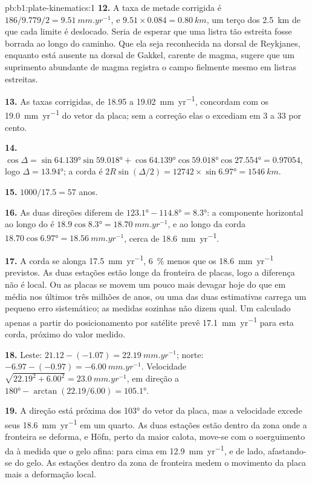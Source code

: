 \begin{solution}{pb:b1:plate-kinematics:1}
\textbf{12.} A taxa de metade corrigida é $186/9.779/2 = \qty{9.51}{mm.yr^{-1}}$,
e $9.51\times0.084 = \qty{0.80}{km}$, um terço dos \qty{2.5}{km} de que
cada limite é deslocado. Seria de esperar que uma listra tão estreita fosse borrada
ao longo do caminho. Que ela seja reconhecida na dorsal de Reykjanes, enquanto está ausente na
dorsal de Gakkel, carente de magma, sugere que um suprimento abundante de
magma registra o campo fielmente mesmo em listras estreitas.

\textbf{13.} As taxas corrigidas, de 18.95 a \qty{19.02}{mm.yr^{-1}}, concordam com
os \qty{19.0}{mm.yr^{-1}} do vetor da placa; sem a correção elas o
excediam em 3 a 33 por cento.

\textbf{14.} $\cos\Delta = \sin\ang{64.139}\sin\ang{59.018} +
\cos\ang{64.139}\cos\ang{59.018}\cos\ang{27.554} = 0.97054$, logo $\Delta =
\ang{13.94}$; a corda é $2R\sin(\Delta/2) = 12742\times\sin\ang{6.97} =
\qty{1546}{km}$.

\textbf{15.} $1000/17.5 = 57$ anos.

\textbf{16.} As duas direções diferem de $\ang{123.1} - \ang{114.8} =
\ang{8.3}$: a componente horizontal ao longo do  é
$18.9\cos\ang{8.3} = \qty{18.70}{mm.yr^{-1}}$, e ao longo da corda
$18.70\cos\ang{6.97} = \qty{18.56}{mm.yr^{-1}}$, cerca de \qty{18.6}{mm.yr^{-1}}.

\textbf{17.} A corda se alonga \qty{17.5}{mm.yr^{-1}}, \qty{6}{\percent}
menos que os \qty{18.6}{mm.yr^{-1}} previstos. As duas estações estão longe da
fronteira de placas, logo a diferença não é local. Ou as placas se movem
um pouco mais devagar hoje do que em média nos últimos três milhões de anos,
ou uma das duas estimativas carrega um pequeno erro sistemático; as medidas
sozinhas não dizem qual. Um  calculado apenas a partir do posicionamento por satélite
prevê \qty{17.1}{mm.yr^{-1}} para esta corda, próximo do valor medido.

\textbf{18.} Leste: $21.12 - (-1.07) = \qty{22.19}{mm.yr^{-1}}$; norte:
$-6.97 - (-0.97) = \qty{-6.00}{mm.yr^{-1}}$. Velocidade $\sqrt{22.19^2 + 6.00^2} =
\qty{23.0}{mm.yr^{-1}}$, em direção a $\ang{180} - \arctan(22.19/6.00) =
\ang{105.1}$.

\textbf{19.} A direção está próxima dos \ang{103} do vetor da placa, mas
a velocidade excede seus \qty{18.6}{mm.yr^{-1}} em um quarto. As duas estações estão
dentro da zona onde a fronteira se deforma, e Höfn, perto da maior
calota, move-se com o soerguimento da  à medida que o gelo afina: para cima em
\qty{12.9}{mm.yr^{-1}}, e de lado, afastando-se do gelo. As estações
dentro da zona de fronteira medem o movimento da placa mais a deformação local.


\end{solution}
